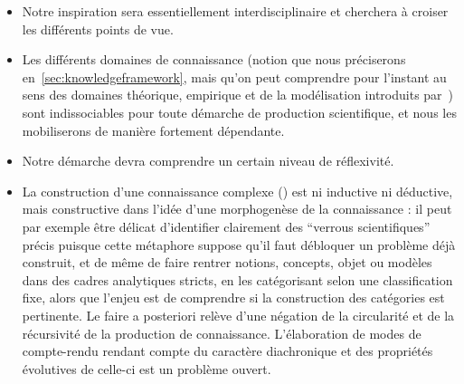 \begin{itemize}
	\item Notre inspiration sera essentiellement interdisciplinaire et cherchera à croiser les différents points de vue.
	\item Les différents domaines de connaissance (notion que nous préciserons en~\ref{sec:knowledgeframework}, mais qu'on peut comprendre pour l'instant au sens des domaines théorique, empirique et de la modélisation introduits par~\cite{livet2010}) sont indissociables pour toute démarche de production scientifique, et nous les mobiliserons de manière fortement dépendante.
	\item Notre démarche devra comprendre un certain niveau de réflexivité.
	\item La construction d'une connaissance complexe (\cite{morin1991methode}) est ni inductive ni déductive, mais constructive dans l'idée d'une morphogenèse de la connaissance : il peut par exemple être délicat d'identifier clairement des ``verrous scientifiques'' précis puisque cette métaphore suppose qu'il faut débloquer un problème déjà construit, et de même de faire rentrer notions, concepts, objet ou modèles dans des cadres analytiques stricts, en les catégorisant selon une classification fixe, alors que l'enjeu est de comprendre si la construction des catégories est pertinente. Le faire a posteriori relève d'une négation de la circularité et de la récursivité de la production de connaissance. L'élaboration de modes de compte-rendu rendant compte du caractère diachronique et des propriétés évolutives de celle-ci est un problème ouvert.
\end{itemize}






\stars












